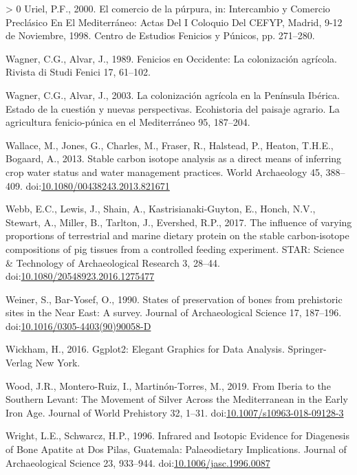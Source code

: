 \documentclass[3p]{elsarticle} %
\newlength{\cslhangindent}
\newenvironment{CSLReferences}[3] %
 {%
  \setlength{\parindent}{0pt}
  \ifodd #1 \everypar{\setlength{\hangindent}{\cslhangindent}}\ignorespaces\fi
  \ifnum #2 > 0
  \setlength{\parskip}{#2\baselineskip}
  \fi
 }%
 {}
\begin{document}
\begin{CSLReferences}{1}{0}
\leavevmode\hypertarget{ref-uriel00}{}%
Uriel, P.F., 2000. El comercio de la púrpura, in: Intercambio y Comercio Preclásico En El {Mediterráneo}: Actas Del {I} Coloquio Del {CEFYP}, {Madrid}, 9-12 de Noviembre, 1998. {Centro de Estudios Fenicios y Púnicos}, pp. 271--280.

\leavevmode\hypertarget{ref-wagner_alvar89}{}%
Wagner, C.G., Alvar, J., 1989. Fenicios en {Occidente}: La colonización agrícola. Rivista di Studi Fenici 17, 61--102.

\leavevmode\hypertarget{ref-wagner_alvar03}{}%
Wagner, C.G., Alvar, J., 2003. La colonización agrícola en la {Península Ibérica}. {Estado} de la cuestión y nuevas perspectivas. Ecohistoria del paisaje agrario. La agricultura fenicio-púnica en el Mediterráneo 95, 187--204.

\leavevmode\hypertarget{ref-wallace_etal13}{}%
Wallace, M., Jones, G., Charles, M., Fraser, R., Halstead, P., Heaton, T.H.E., Bogaard, A., 2013. Stable carbon isotope analysis as a direct means of inferring crop water status and water management practices. World Archaeology 45, 388--409. doi:\href{https://doi.org/10.1080/00438243.2013.821671}{10.1080/00438243.2013.821671}

\leavevmode\hypertarget{ref-webb_etal17a}{}%
Webb, E.C., Lewis, J., Shain, A., Kastrisianaki-Guyton, E., Honch, N.V., Stewart, A., Miller, B., Tarlton, J., Evershed, R.P., 2017. The influence of varying proportions of terrestrial and marine dietary protein on the stable carbon-isotope compositions of pig tissues from a controlled feeding experiment. STAR: Science \& Technology of Archaeological Research 3, 28--44. doi:\href{https://doi.org/10.1080/20548923.2016.1275477}{10.1080/20548923.2016.1275477}

\leavevmode\hypertarget{ref-weiner_bar-yosef90}{}%
Weiner, S., Bar-Yosef, O., 1990. States of preservation of bones from prehistoric sites in the {Near East}: {A} survey. Journal of Archaeological Science 17, 187--196. doi:\href{https://doi.org/10.1016/0305-4403(90)90058-D}{10.1016/0305-4403(90)90058-D}

\leavevmode\hypertarget{ref-wickham16}{}%
Wickham, H., 2016. Ggplot2: {Elegant Graphics} for {Data Analysis}. {Springer-Verlag New York}.

\leavevmode\hypertarget{ref-wood_etal19}{}%
Wood, J.R., Montero-Ruiz, I., Martinón-Torres, M., 2019. From {Iberia} to the {Southern Levant}: {The Movement} of {Silver Across} the {Mediterranean} in the {Early Iron Age}. Journal of World Prehistory 32, 1--31. doi:\href{https://doi.org/10.1007/s10963-018-09128-3}{10.1007/s10963-018-09128-3}

\leavevmode\hypertarget{ref-wright_schwarcz96}{}%
Wright, L.E., Schwarcz, H.P., 1996. Infrared and {Isotopic Evidence} for {Diagenesis} of {Bone Apatite} at {Dos Pilas}, {Guatemala}: {Palaeodietary Implications}. Journal of Archaeological Science 23, 933--944. doi:\href{https://doi.org/10.1006/jasc.1996.0087}{10.1006/jasc.1996.0087}

\end{CSLReferences}
\end{document}
